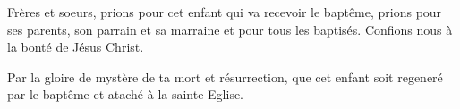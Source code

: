 Frères et soeurs, prions pour cet enfant
qui va recevoir le baptême, prions pour ses parents, son parrain
et sa marraine et pour tous les baptisés. Confions nous à la bonté
de Jésus Christ.

 Par la gloire de mystère de ta mort et résurrection,
que cet enfant soit regeneré par le baptême et ataché à la sainte Eglise.
